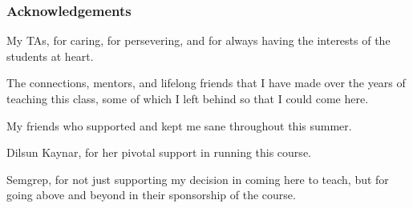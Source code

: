 \documentclass[aspectratio=169, handout]{beamer}
\begin{document}
\begin{frame}[fragile]
  \frametitle{Acknowledgements}

  \begin{center}
    My TAs, for caring, for persevering, and for always having the interests
    of the students at heart.

    \pause
    \vspace{\fill}

    The connections, mentors, and lifelong friends that I have made over
    the years of teaching this class, some of which I left behind so that I
    could come here.

    \pause
    \vspace{\fill}

    My friends who supported and kept me sane throughout this summer.

    \pause
    \vspace{\fill}

    Dilsun Kaynar, for her pivotal support in running this course.

    \pause
    \vspace{\fill}

    Semgrep, for not just supporting my decision in coming here to teach, but for
    going above and beyond in their sponsorship of the course.
  \end{center}
\end{frame}
\end{document}
